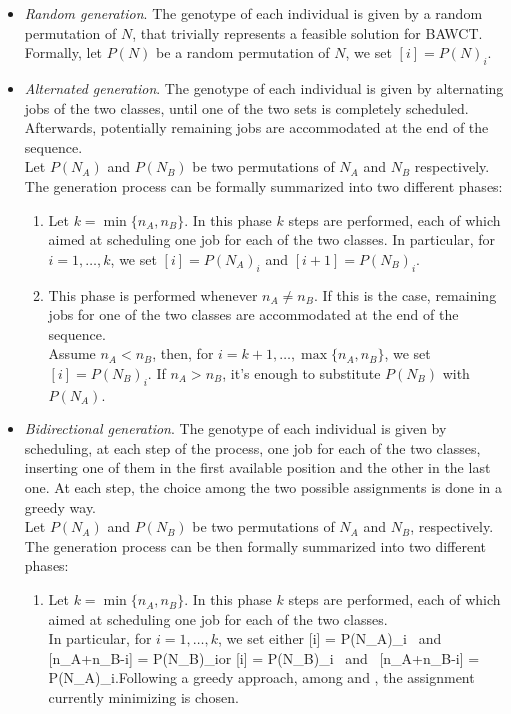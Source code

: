 \documentclass[opre,nonblindrev]{informs3} %
\begin{document}
\begin{itemize}
	\item \textit{Random generation}. The genotype of each individual is given by a random permutation of $N$, that trivially represents a feasible solution for BAWCT. Formally, let $P(N)$ be a random permutation of $N$, we set $[i] =  P(N)_i$. 
	\item \textit{Alternated generation}. The genotype of each individual is given by alternating jobs of the two classes, until one of the two sets is completely scheduled. Afterwards, potentially remaining jobs are accommodated at the end of the sequence.\\
	 Let $P(N_A)$ and $P(N_B)$ be two permutations of $N_A$ and $N_B$ respectively. The generation process can be formally summarized into two different phases:
	\begin{enumerate}
		\item Let $k = \min\{n_A,n_B\}$. In this phase $k$ steps are performed, each of which aimed at scheduling one job for each of the two classes. In particular, for $i=1,\ldots,k$, we set $[i] = P(N_A)_i$ and $[i+1] = P(N_B)_i$.
		\item This phase is performed whenever $n_A \ne n_B$. If this is the case, remaining jobs for one of the two classes are accommodated at the end of the sequence.\\ Assume $n_A<n_B$, then, for $i=k+1,\ldots,\max\{n_A,n_B\}$, we set $[i] = P(N_B)_i.$ If $n_A>n_B$, it's enough to substitute $P(N_B)$ with $P(N_A)$. 
	\end{enumerate}
	\item \textit{Bidirectional generation}. The genotype of each individual is given by scheduling, at each step of the process, one job for each of the two classes, inserting one of them in the first available position and the other in the last one. At each step, the choice among the two possible assignments is done in a greedy way.\\
	Let $P(N_A)$ and $P(N_B)$ be two permutations of $N_A$ and $N_B$, respectively. The generation process can be then formally summarized into two different phases:
	\begin{enumerate}
		\item Let $k = \min\{n_A,n_B\}$. In this phase $k$ steps are performed, each of which aimed at scheduling one job for each of the two classes.\\ In particular, for $i=1,\ldots,k$, we set either \be \label{eq1}[i] = P(N_A)_i \mbox{ and } [n_A+n_B-i] = P(N_B)_i\ee or \be \label{eq2}[i] = P(N_B)_i \mbox{ and } [n_A+n_B-i] = P(N_A)_i.\ee Following a greedy approach, among  and , the assignment currently minimizing  is chosen.  

\end{enumerate}
\end{itemize}
\end{document}
